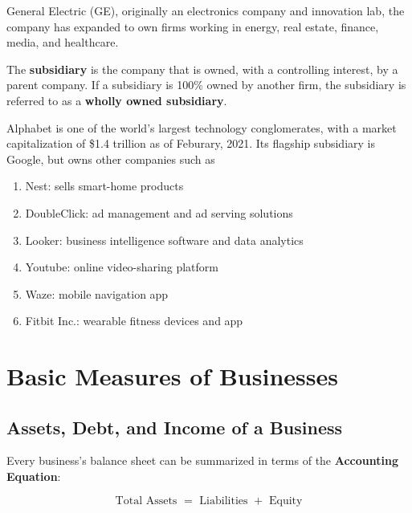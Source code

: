 \documentclass{article}
\begin{document}
      \begin{example}
        General Electric (GE), originally an electronics company and innovation lab, the company has expanded to own firms working in energy, real estate, finance, media, and healthcare. 
      \end{example}

      \begin{definition}[Subsidiary]
        The \textbf{subsidiary} is the company that is owned, with a controlling interest, by a parent company. If a subsidiary is 100\% owned by another firm, the subsidiary is referred to as a \textbf{wholly owned subsidiary}. 
      \end{definition}

      \begin{definition}[Alphabet]
        Alphabet is one of the world's largest technology conglomerates, with a market capitalization of \$1.4 trillion as of Feburary, 2021. Its flagship subsidiary is Google, but owns other companies such as
        \begin{enumerate}
          \item Nest: sells smart-home products
          \item DoubleClick: ad management and ad serving solutions
          \item Looker: business intelligence software and data analytics
          \item Youtube: online video-sharing platform
          \item Waze: mobile navigation app
          \item Fitbit Inc.: wearable fitness devices and app
        \end{enumerate}
      \end{definition}

\section{Basic Measures of Businesses} 

  \subsection{Assets, Debt, and Income of a Business}

    Every business's balance sheet can be summarized in terms of the \textbf{Accounting Equation}:

    \begin{equation}
      \text{Total Assets } = \text{ Liabilities } + \text{ Equity}
    \end{equation}
\end{document}
